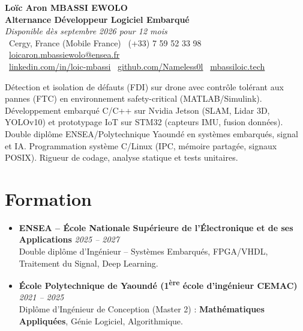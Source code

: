 \documentclass[a4paper,11pt]{article}
\begin{document}
\begin{center}
    {\Large \textbf{Loïc Aron MBASSI EWOLO}} \\ \vspace{4pt}
    \textbf{\large Alternance Développeur Logiciel Embarqué} \\
    \textit{\small Disponible dès septembre 2026 pour 12 mois} \\ \vspace{4pt}
    \small
    \faMapMarker\ Cergy, France (Mobile France) \quad
    \faPhone\ (+33) 7 59 52 33 98 \quad
    {\color{primary}\faEnvelope\ \href{mailto:loicaron.mbassiewolo@ensea.fr}{loicaron.mbassiewolo@ensea.fr}} \\ \vspace{2pt}
    {\color{primary}\faLinkedin\ \href{https://www.linkedin.com/in/loic-mbassi/}{linkedin.com/in/loic-mbassi}} \quad
    {\color{primary}\faGithub\ \href{https://github.com/Nameless0l}{github.com/Nameless0l}} \quad
    {\color{primary}\faGlobe\ \href{https://mbassiloic.tech}{mbassiloic.tech}}
\end{center}

\vspace{-6pt}

\noindent\small{Détection et isolation de défauts (FDI) sur drone avec contrôle tolérant aux pannes (FTC) en environnement safety-critical (MATLAB/Simulink). Développement embarqué C/C++ sur Nvidia Jetson (SLAM, Lidar 3D, YOLOv10) et prototypage IoT sur STM32 (capteurs IMU, fusion données). Double diplôme ENSEA/Polytechnique Yaoundé en systèmes embarqués, signal et IA. Programmation système C/Linux (IPC, mémoire partagée, signaux POSIX). Rigueur de codage, analyse statique et tests unitaires.}

\section{Formation}
\begin{itemize}[leftmargin=*, label=\tiny$\bullet$, nosep]
    \item \textbf{ENSEA -- École Nationale Supérieure de l'Électronique et de ses Applications} \hfill \textit{2025 -- 2027} \\
    \small{Double diplôme d'Ingénieur -- Systèmes Embarqués, FPGA/VHDL, Traitement du Signal, Deep Learning.}
    \item \textbf{École Polytechnique de Yaoundé (1\textsuperscript{ère} école d'ingénieur CEMAC)} \hfill \textit{2021 -- 2025} \\
    \small{Diplôme d'Ingénieur de Conception (Master 2) : \textbf{Mathématiques Appliquées}, Génie Logiciel, Algorithmique.}
\end{itemize}
\end{document}

